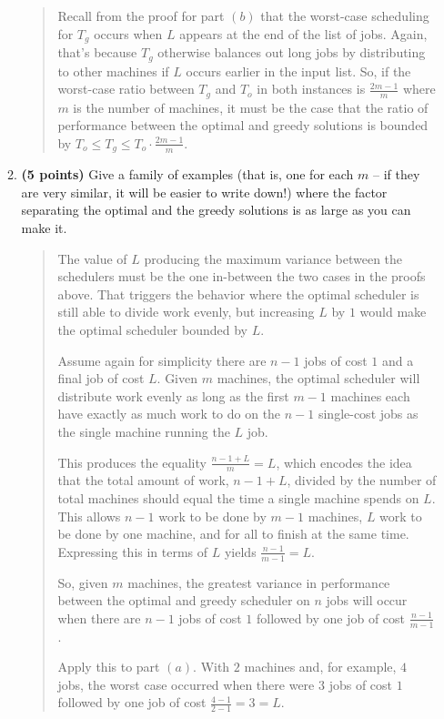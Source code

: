 \documentclass[11pt]{article}
\begin{document}
\begin{enumerate}
\begin{enumerate}
\begin{quote}
  \medskip
  Recall from the proof for part $(b)$ that the worst-case scheduling for $T_g$ occurs when $L$ appears at the end of the list of jobs. Again, that's because $T_g$ otherwise balances out long jobs by distributing to other machines if $L$ occurs earlier in the input list. So, if the worst-case ratio between $T_g$ and $T_o$ in both instances is $\frac{2m - 1}{m}$ where $m$ is the number of machines, it must be the case that the ratio of performance between the optimal and greedy solutions is bounded by $T_o \leq T_g \leq T_o \cdot \frac{2m - 1}{m}$.
\end{quote}
\item
{\bf (5 points)} 
Give a family of examples (that is, one for
each $m$ -- if they are very similar, it will be easier to write
down!) where the factor separating the optimal and the greedy solutions
is as large as you can make it.
\begin{quote}
  \color{purple}
The value of $L$ producing the maximum variance between the schedulers must be the one in-between the two cases in the proofs above. That triggers the behavior where the optimal scheduler is still able to divide work evenly, but increasing $L$ by $1$ would make the optimal scheduler bounded by $L$.

\medskip
Assume again for simplicity there are $n - 1$ jobs of cost $1$ and a final job of cost $L$. Given $m$ machines, the optimal scheduler will distribute work evenly as long as the first $m - 1$ machines each have exactly as much work to do on the $n - 1$ single-cost jobs as the single machine running the $L$ job. 

\medskip
This produces the equality $\frac{n - 1 + L}{m} = L$, which encodes the idea that the total amount of work, $n - 1 + L$, divided by the number of total machines should equal the time a single machine spends on $L$. This allows $n - 1$ work to be done by $m - 1$ machines, $L$ work to be done by one machine, and for all to finish at the same time. Expressing this in terms of $L$ yields $\frac{n - 1}{m - 1} = L$. 

So, given $m$ machines, the greatest variance in performance between the optimal and greedy scheduler on $n$ jobs will occur when there are $n - 1$ jobs of cost $1$ followed by one job of cost $\frac{n - 1}{m - 1}$.

\medskip
Apply this to part $(a)$. With $2$ machines and, for example, $4$ jobs, the worst case occurred when there were $3$ jobs of cost $1$ followed by one job of cost $\frac{4 - 1}{2 - 1} = 3 = L$. 


\end{quote}
\end{enumerate}
\end{enumerate}
\end{document}
